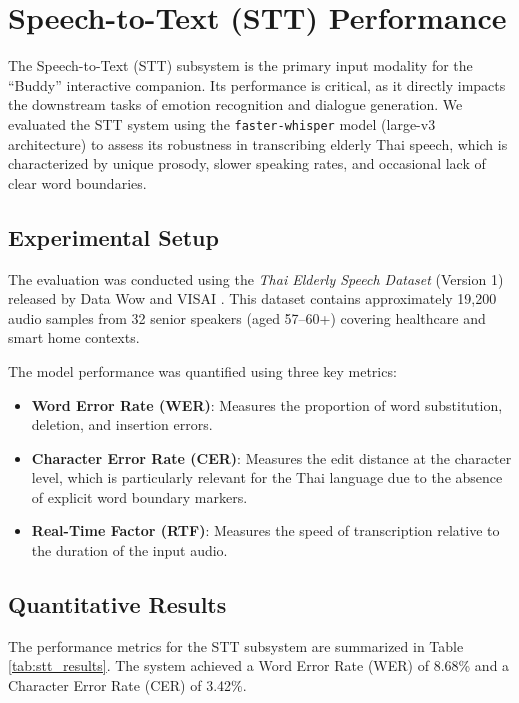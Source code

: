 \section{Speech-to-Text (STT) Performance}
\label{sec:stt_performance}

The Speech-to-Text (STT) subsystem is the primary input modality for the ``Buddy'' interactive companion. Its performance is critical, as it directly impacts the downstream tasks of emotion recognition and dialogue generation. We evaluated the STT system using the \texttt{faster-whisper} model (large-v3 architecture) to assess its robustness in transcribing elderly Thai speech, which is characterized by unique prosody, slower speaking rates, and occasional lack of clear word boundaries.

\subsection{Experimental Setup}
The evaluation was conducted using the \textit{Thai Elderly Speech Dataset} (Version 1) released by Data Wow and VISAI \cite{datawow2024elderly}. This dataset contains approximately 19,200 audio samples from 32 senior speakers (aged 57--60+) covering healthcare and smart home contexts.

The model performance was quantified using three key metrics:
\begin{itemize}
    \item \textbf{Word Error Rate (WER)}: Measures the proportion of word substitution, deletion, and insertion errors.
    \item \textbf{Character Error Rate (CER)}: Measures the edit distance at the character level, which is particularly relevant for the Thai language due to the absence of explicit word boundary markers.
    \item \textbf{Real-Time Factor (RTF)}: Measures the speed of transcription relative to the duration of the input audio.
\end{itemize}

\subsection{Quantitative Results}
The performance metrics for the STT subsystem are summarized in Table \ref{tab:stt_results}. The system achieved a Word Error Rate (WER) of 8.68\% and a Character Error Rate (CER) of 3.42\%.

